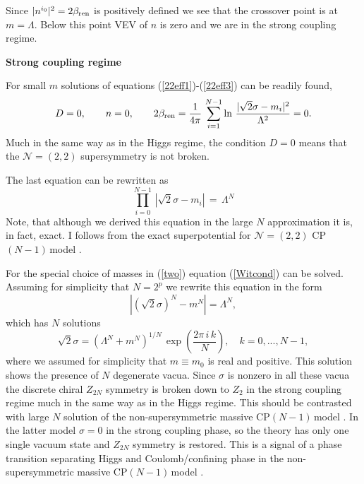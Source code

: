 \documentclass[epsfig,12pt]{article}
\def\beq{\begin{equation}}
\def\eeq{\end{equation}}
\newcommand{\cpn}{CP$(N-1)\,$}
\def\beq{\begin{equation}}
\def\eeq{\end{equation}}
\newcommand{\ntwot}{${\mathcal N}= \left(2,2\right) $ }
\begin{document}
Since $|n^{i_0}|^2=2\beta_{\rm ren}$ is positively defined we see that the crossover point is
at $m=\Lambda$. Below this point VEV of $n$ is zero and we are in the strong coupling regime.

\begin{center}
{\bf Strong coupling regime}
\end{center}

For small $m$ 
solutions of equations (\ref{22eff1})-(\ref{22eff3}) can be readily found,
\beq
D=0,\qquad n=0,\qquad
2\beta_{\rm ren}=\frac{1}{4\pi}\, 
\sum_{i=1}^{N-1}\ln\, {\frac{|\sqrt{2}\sigma-m_i|^2}{\Lambda^2}}=0.
\label{strongvac}
\eeq
Much in the same way as in the Higgs regime, the condition $D=0$ means that the \ntwot
 supersymmetry is not broken.

The last equation can be rewritten as 
\beq
\prod_{i=0}^{N-1}\,|\sqrt{2}\sigma-m_i| \,=\,\Lambda^N
\label{Witcond}
\eeq
Note, that although we derived this equation in the large $N$ approximation it is, in fact,
exact. I follows from the  exact superpotential for \ntwot \cpn model \cite{AdDVecSal,ChVa,W93,HaHo,Dor}.

For the special choice of masses
 in (\ref{two}) equation (\ref{Witcond}) can be solved. Assuming for simplicity that $N=2^p$
we rewrite this equation in the form
\beq
|(\sqrt{2}\sigma)^N-m^N|=\Lambda^N,
\eeq
which has $N$ solutions
\beq
\sqrt{2}\sigma =\left(\Lambda^N+m^N\right)^{1/N}\,
\exp\left( \frac{2\pi\,i\, k}{N}
\right), \quad k=0, ..., N-1,
\label{22sigma}
\eeq
where we assumed for simplicity that $m\equiv m_0$ is real and positive.
This solution shows the presence of $N$ degenerate vacua. Since $\sigma$ is nonzero in all these vacua
the discrete chiral $Z_{2N}$ symmetry is broken down to $Z_2$ in the strong coupling regime much in the   same way as
in the Higgs regime. This should be contrasted with large $N$ solution of the non-supersymmetric
massive \cpn model \cite{GSYphtr}. In the latter model $\sigma=0$ in the strong coupling phase, so the theory
has only one single vacuum state and $Z_{2N}$ symmetry is restored. This is a signal of a phase transition
separating Higgs and Coulomb/confining phase in the non-supersymmetric massive \cpn model \cite{GSYphtr}.
\end{document}
